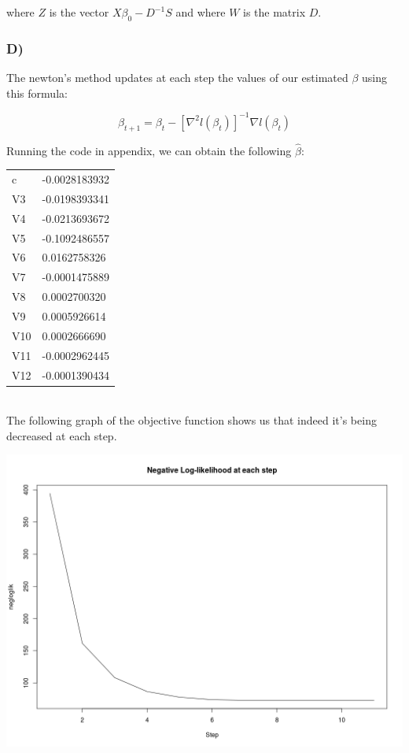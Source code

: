 \documentclass{article}
\begin{document}
where $Z$ is the vector $X\beta_0-D^{-1}S$ and where $W$ is the matrix $D$.

\subsubsection*{D)}

The newton's method updates at each step the values of our estimated $\beta$ using this formula:

\begin{equation*}
\beta_{t+1}=\beta_t-[\nabla^2 l(\beta_t)]^{-1}\nabla l(\beta_t)
\end{equation*}

Running the code in appendix, we can obtain the following $\hat{\beta}$:\\

\begin{tabular}{ll}
c           &-0.0028183932\\
V3          &-0.0198393341\\
V4          &-0.0213693672\\
V5          &-0.1092486557\\
V6          & 0.0162758326\\
V7          &-0.0001475889\\
V8          & 0.0002700320\\
V9          & 0.0005926614\\
V10         & 0.0002666690\\
V11         &-0.0002962445\\
V12         &-0.0001390434
\end{tabular}\\

The following graph of the objective function shows us that indeed it's being decreased at each step.

\includegraphics[width=\textwidth]{Rplot_newton.png}
\end{document}
